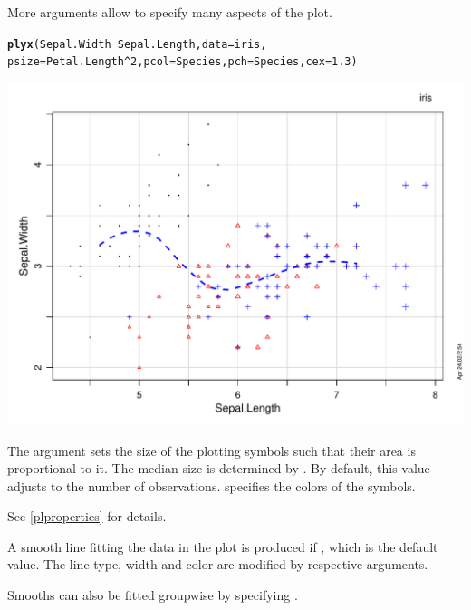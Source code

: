 \documentclass[11pt]{article}\usepackage[]{graphicx}\usepackage[]{color}
\makeatletter
\def\maxwidth{ %
  \ifdim\Gin@nat@width>\linewidth
    \linewidth
  \else
    \Gin@nat@width
  \fi
}
\newcommand{\hlnum}[1]{\textcolor[rgb]{0.686,0.059,0.569}{#1}}%
\newcommand{\hlopt}[1]{\textcolor[rgb]{0,0,0}{#1}}%
\newcommand{\hlstd}[1]{\textcolor[rgb]{0.345,0.345,0.345}{#1}}%
\newcommand{\hlkwc}[1]{\textcolor[rgb]{0.333,0.667,0.333}{#1}}%
\newcommand{\hlkwd}[1]{\textcolor[rgb]{0.737,0.353,0.396}{\textbf{#1}}}%
\newenvironment{kframe}{%
 \def\at@end@of@kframe{}%
 \ifinner\ifhmode%
  \def\at@end@of@kframe{\end{minipage}}%
  \begin{minipage}{\columnwidth}%
 \fi\fi%
 \def\FrameCommand##1{\hskip\@totalleftmargin \hskip-\fboxsep
 \colorbox{shadecolor}{##1}\hskip-\fboxsep
     \hskip-\linewidth \hskip-\@totalleftmargin \hskip\columnwidth}%
 \MakeFramed {\advance\hsize-\width
   \@totalleftmargin\z@ \linewidth\hsize
   \@setminipage}}%
 {\par\unskip\endMakeFramed%
 \at@end@of@kframe}
\newenvironment{knitrout}{}{} %
\makeatother
\begin{document}
More arguments allow to specify many aspects of the plot.
\begin{knitrout}
\color{fgcolor}\begin{kframe}
\begin{alltt}
\hlkwd{plyx}\hlstd{(Sepal.Width}\hlopt{~}\hlstd{Sepal.Length,} \hlkwc{data}\hlstd{=iris,}
     \hlkwc{psize}\hlstd{=Petal.Length}\hlopt{^}\hlnum{2}\hlstd{,} \hlkwc{pcol}\hlstd{=Species,} \hlkwc{pch}\hlstd{=Species,} \hlkwc{cex}\hlstd{=}\hlnum{1.3}\hlstd{)}
\end{alltt}
\end{kframe}
\includegraphics[width=\maxwidth]{figure/plyx_pchar-1} 

\end{knitrout}
The argument  sets the size of the plotting symbols
such that their area is proportional to it.
The median size is determined by .
By default, this value adjusts to the number of observations.
 specifies the colors of the symbols.

See \ref{plproperties} for details.

A smooth line fitting the data in the plot is produced if 
, which is the default value. 
The line type, width and color are modified by respective arguments.

Smooths can also be fitted groupwise by specifying .
\end{document}
